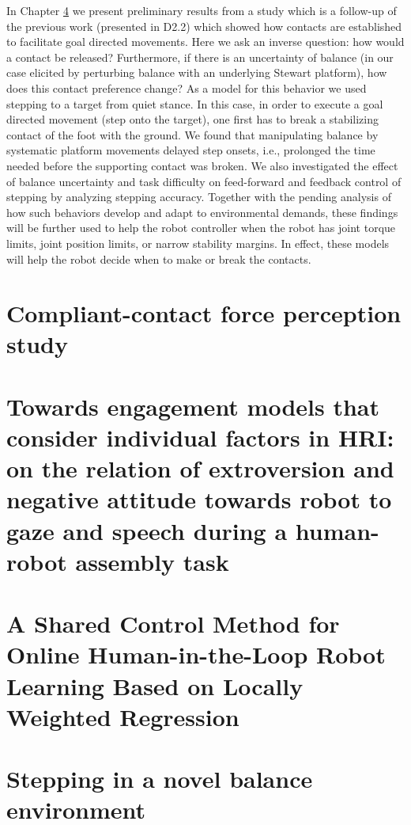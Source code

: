 \documentclass[12pt,a4paper,twoside]{report}
\begin{document}
In Chapter \ref{sec:Zrinka} we present preliminary results from a study which is a follow-up of the previous work (presented in D2.2) which showed how contacts are established to facilitate goal directed movements. Here we ask an inverse question: how would a contact be released? Furthermore, if there is an uncertainty of balance (in our case elicited by perturbing balance with an underlying Stewart platform), how does this contact preference change? As a model for this behavior we used stepping to a target from quiet stance. In this case, in order to execute a goal directed movement (step onto the target), one first has to break a stabilizing contact of the foot with the ground. We found that manipulating balance by systematic platform movements delayed step onsets, i.e., prolonged the time needed before the supporting contact was broken. We also investigated the effect of balance uncertainty and task difficulty on feed-forward and feedback control of stepping by analyzing stepping  accuracy. Together with the pending analysis of how such behaviors develop and adapt to environmental demands, these findings will be further used to help the robot controller when the robot has joint torque limits, joint position limits, or narrow stability margins. In effect, these models will help the robot decide when to make or break the contacts.


\newpage{}
\chapter{Compliant-contact force perception study}\label{sec:Chie}
\setcounter{figure}{0}

\clearpage{}

\chapter{Towards engagement models that consider individual factors in HRI: on the relation of extroversion and negative attitude towards robot to gaze and speech during a human-robot assembly task}\label{sec:Serena}
\setcounter{figure}{0}

\clearpage{}

\chapter{A Shared Control Method for Online Human-in-the-Loop Robot Learning Based on Locally Weighted Regression}\label{sec:Luka}
\setcounter{figure}{0}

\clearpage

\chapter{Stepping in a novel balance environment}\label{sec:Zrinka}
\setcounter{figure}{0}

\clearpage{}



\end{document}
